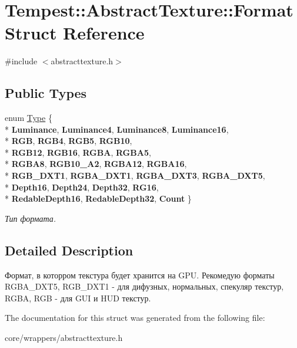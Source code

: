 \hypertarget{struct_tempest_1_1_abstract_texture_1_1_format}{\section{Tempest\+:\+:Abstract\+Texture\+:\+:Format Struct Reference}
\label{struct_tempest_1_1_abstract_texture_1_1_format}
}


{\ttfamily \#include $<$abstracttexture.\+h$>$}

\subsection*{Public Types}
\begin{DoxyCompactItemize}
\item 
\hypertarget{struct_tempest_1_1_abstract_texture_1_1_format_a231a1f516e53783bf72c713669b115b3}{enum \hyperlink{struct_tempest_1_1_abstract_texture_1_1_format_a231a1f516e53783bf72c713669b115b3}{Type} \{ \\*
{\bfseries Luminance}, 
{\bfseries Luminance4}, 
{\bfseries Luminance8}, 
{\bfseries Luminance16}, 
\\*
{\bfseries R\+G\+B}, 
{\bfseries R\+G\+B4}, 
{\bfseries R\+G\+B5}, 
{\bfseries R\+G\+B10}, 
\\*
{\bfseries R\+G\+B12}, 
{\bfseries R\+G\+B16}, 
{\bfseries R\+G\+B\+A}, 
{\bfseries R\+G\+B\+A5}, 
\\*
{\bfseries R\+G\+B\+A8}, 
{\bfseries R\+G\+B10\+\_\+\+A2}, 
{\bfseries R\+G\+B\+A12}, 
{\bfseries R\+G\+B\+A16}, 
\\*
{\bfseries R\+G\+B\+\_\+\+D\+X\+T1}, 
{\bfseries R\+G\+B\+A\+\_\+\+D\+X\+T1}, 
{\bfseries R\+G\+B\+A\+\_\+\+D\+X\+T3}, 
{\bfseries R\+G\+B\+A\+\_\+\+D\+X\+T5}, 
\\*
{\bfseries Depth16}, 
{\bfseries Depth24}, 
{\bfseries Depth32}, 
{\bfseries R\+G16}, 
\\*
{\bfseries Redable\+Depth16}, 
{\bfseries Redable\+Depth32}, 
{\bfseries Count}
 \}}\label{struct_tempest_1_1_abstract_texture_1_1_format_a231a1f516e53783bf72c713669b115b3}

\begin{DoxyCompactList}\small\item\em Тип формата. \end{DoxyCompactList}\end{DoxyCompactItemize}


\subsection{Detailed Description}
Формат, в которром текстура будет хранится на G\+P\+U. Рекомедую форматы R\+G\+B\+A\+\_\+\+D\+X\+T5, R\+G\+B\+\_\+\+D\+X\+T1 -\/ для дифузных, нормальных, спекуляр текстур, R\+G\+B\+A, R\+G\+B -\/ для G\+U\+I и H\+U\+D текстур. 

The documentation for this struct was generated from the following file\+:\begin{DoxyCompactItemize}
\item 
core/wrappers/abstracttexture.\+h\end{DoxyCompactItemize}
